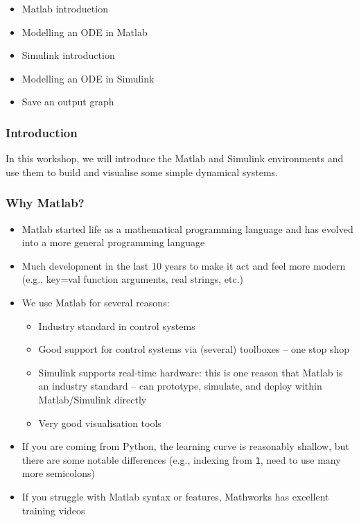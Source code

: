 \documentclass[9pt]{beamer-control}
\begin{document}

\begin{SUMMARY}
  \begin{itemize}
    \item Matlab introduction
    \item Modelling an ODE in Matlab
    \item Simulink introduction
    \item Modelling an ODE in Simulink
    \item Save an output graph
  \end{itemize}
\end{SUMMARY}


\begin{frame}
  \frametitle{Introduction}
  In this workshop, we will introduce the Matlab and Simulink environments and use them to build and visualise some simple dynamical systems.
\end{frame}


\begin{frame}
  \frametitle{Why Matlab?}
  \begin{itemize}
    \item Matlab started life as a mathematical programming language and has evolved into a more general programming language
    \item Much development in the last 10 years to make it act and feel more modern (e.g., key=val function arguments, real strings, etc.)
    \item We use Matlab for several reasons:
      \begin{itemize}
        \item  Industry standard in control systems
        \item  Good support for control systems via (several) toolboxes -- one stop shop
        \item  Simulink supports real-time hardware: this is one reason that Matlab is an industry standard -- can prototype, simulate, and deploy within Matlab/Simulink directly
        \item  Very good visualisation tools
      \end{itemize}
    \item If you are coming from Python, the learning curve is reasonably shallow, but there are some notable differences (e.g., indexing from \texttt{1}, need to use many more semicolons)
    \item If you struggle with Matlab syntax or features, Mathworks has excellent training videos
  \end{itemize}
\end{frame}
\end{document}
